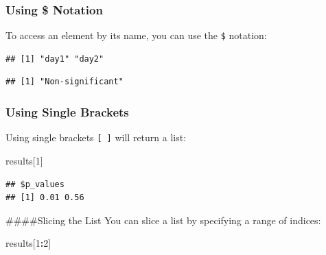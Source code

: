 \documentclass[
]{book}
\newenvironment{Shaded}{\begin{snugshade}}{\end{snugshade}}
\newcommand{\DecValTok}[1]{\textcolor[rgb]{0.00,0.00,0.81}{#1}}
\newcommand{\NormalTok}[1]{#1}
\newcommand{\SpecialCharTok}[1]{\textcolor[rgb]{0.81,0.36,0.00}{\textbf{#1}}}
\begin{document}
\hypertarget{using-notation}{%
\subsubsection{Using \$ Notation}\label{using-notation}}

To access an element by its name, you can use the \texttt{\$} notation:

\begin{Shaded}
\end{Shaded}

\begin{verbatim}
## [1] "day1" "day2"
\end{verbatim}

\begin{Shaded}
\end{Shaded}

\begin{verbatim}
## [1] "Non-significant"
\end{verbatim}

\hypertarget{using-single-brackets}{%
\subsubsection{Using Single Brackets}\label{using-single-brackets}}

Using single brackets \texttt{{[}\ {]}} will return a list:

\begin{Shaded}
\begin{Highlighting}[]
\NormalTok{results[}\DecValTok{1}\NormalTok{]}
\end{Highlighting}
\end{Shaded}

\begin{verbatim}
## $p_values
## [1] 0.01 0.56
\end{verbatim}

\#\#\#\#Slicing the List
You can slice a list by specifying a range of indices:

\begin{Shaded}
\begin{Highlighting}[]
\NormalTok{results[}\DecValTok{1}\SpecialCharTok{:}\DecValTok{2}\NormalTok{]}
\end{Highlighting}
\end{Shaded}
\end{document}
